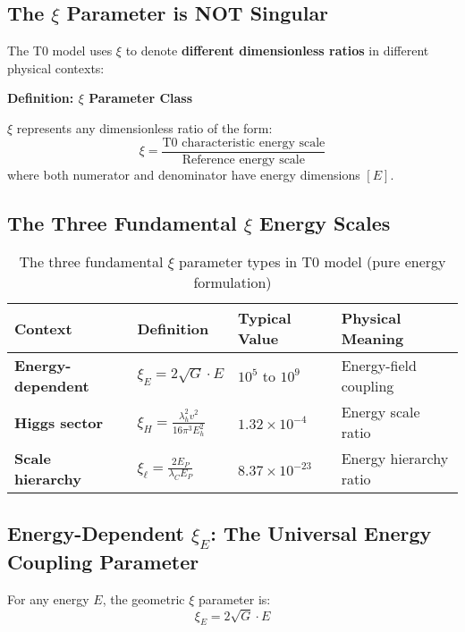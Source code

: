 \documentclass[12pt,a4paper]{article}
\begin{document}
\subsection{The $\xi$ Parameter is NOT Singular}
\label{subsec:xi_not_singular}

The T0 model uses $\xi$ to denote \textbf{different dimensionless ratios} in different physical contexts:

\textbf{Definition: $\xi$ Parameter Class}

$\xi$ represents any dimensionless ratio of the form:
\begin{equation}
	\xi = \frac{\text{T0 characteristic energy scale}}{\text{Reference energy scale}}
\end{equation}
where both numerator and denominator have energy dimensions $[E]$.

\subsection{The Three Fundamental $\xi$ Energy Scales}
\label{subsec:three_xi_scales}

\begin{table}[htbp]
	\centering
	\begin{tabular}{|p{3cm}|p{4cm}|p{3cm}|p{4cm}|}
		\hline
		\textbf{Context} & \textbf{Definition} & \textbf{Typical Value} & \textbf{Physical Meaning} \\
		\hline
		\textbf{Energy-dependent} & $\xi_E = 2\sqrt{G} \cdot E$ & $10^5$ to $10^9$ & Energy-field coupling \\
		\hline
		\textbf{Higgs sector} & $\xi_H = \frac{\lambda_h^2 v^2}{16\pi^3 E_h^2}$ & $1.32 \times 10^{-4}$ & Energy scale ratio \\
		\hline
		\textbf{Scale hierarchy} & $\xi_\ell = \frac{2E_P}{\lambda_C E_P}$ & $8.37 \times 10^{-23}$ & Energy hierarchy ratio \\
		\hline
	\end{tabular}
	\caption{The three fundamental $\xi$ parameter types in T0 model (pure energy formulation)}
	\label{tab:xi_hierarchy}
\end{table}

\subsection{Energy-Dependent $\xi_E$: The Universal Energy Coupling Parameter}
\label{subsec:xi_energy_dependent}

For any energy $E$, the geometric $\xi$ parameter is:
\begin{equation}
	\boxed{\xi_E = 2\sqrt{G} \cdot E}
\end{equation}
\end{document}
